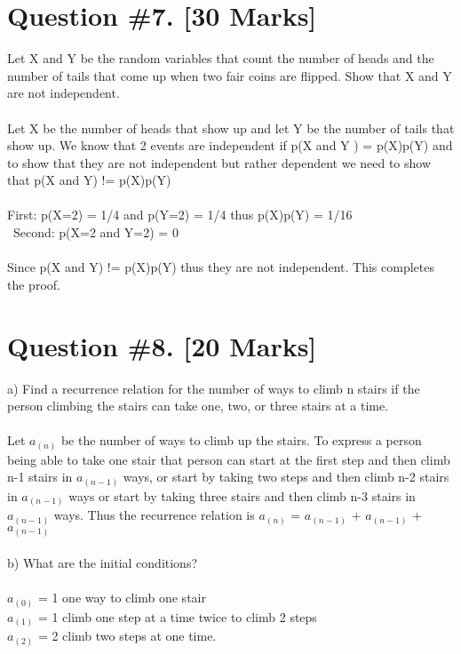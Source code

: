 \documentclass{article}
\begin{document}
\section{Question \#7. [30 Marks]}
Let X and Y be the random variables that count the number of heads and the number of tails that come up when two fair coins are flipped. Show that X and Y are not independent. \\\\
Let X be the number of heads that show up and let Y be the number of tails that show up. We know that 2 events are independent if p(X and Y ) = p(X)p(Y) and to show that they are not independent but rather dependent we need to show that p(X and Y) != p(X)p(Y) \\\\
First: p(X=2) = 1/4 and p(Y=2) = 1/4 thus p(X)p(Y) = 1/16 \\\
Second: p(X=2 and Y=2) = 0  \\\\
Since p(X and Y) != p(X)p(Y) thus they are not independent. This completes the proof.
\newpage

\section{Question \#8. [20 Marks]}
a) Find a recurrence relation for the number of ways to climb n stairs if the person climbing the stairs can take one, two, or three stairs at a time. \\\\
Let $a_{(n)}$ be the number of ways to climb up the stairs. To express a person being able to take one stair that person can start at the first step and then climb n-1 stairs in $a_{(n-1)}$ ways, or start by taking two steps and then climb n-2 stairs in $a_{(n-1)}$ ways or start by taking three stairs and then climb n-3 stairs in $a_{(n-1)}$ ways. Thus the recurrence relation is $a_{(n)}$ =  $a_{(n-1)}$ + $a_{(n-1)}$ + $a_{(n-1)}$   \\\\
b) What are the initial conditions? \\\\
$a_{(0)}$ = 1 one way to climb one stair \\ 
$a_{(1)}$ = 1 climb one step at a time twice to climb 2 steps \\ 
$a_{(2)}$ = 2  climb two steps at one time. \\
\newpage
\end{document}
